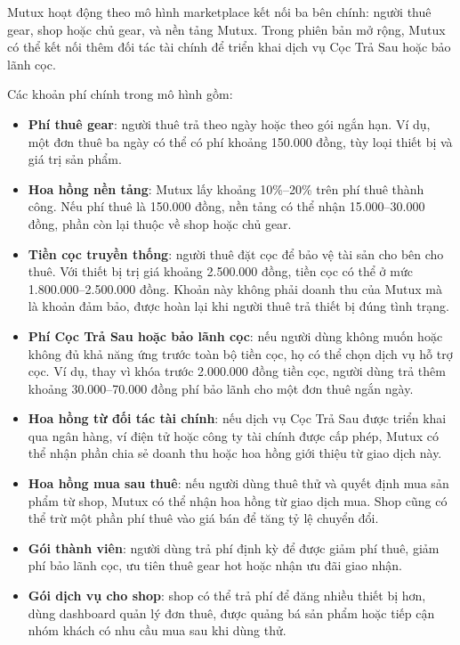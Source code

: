 Mutux hoạt động theo mô hình marketplace kết nối ba bên chính: người thuê gear, shop hoặc chủ gear, và nền tảng Mutux. Trong phiên bản mở rộng, Mutux có thể kết nối thêm đối tác tài chính để triển khai dịch vụ Cọc Trả Sau hoặc bảo lãnh cọc.

Các khoản phí chính trong mô hình gồm:

\begin{itemize}
    \item \textbf{Phí thuê gear}: người thuê trả theo ngày hoặc theo gói ngắn hạn. Ví dụ, một đơn thuê ba ngày có thể có phí khoảng 150.000 đồng, tùy loại thiết bị và giá trị sản phẩm.
    \item \textbf{Hoa hồng nền tảng}: Mutux lấy khoảng 10\%--20\% trên phí thuê thành công. Nếu phí thuê là 150.000 đồng, nền tảng có thể nhận 15.000--30.000 đồng, phần còn lại thuộc về shop hoặc chủ gear.
    \item \textbf{Tiền cọc truyền thống}: người thuê đặt cọc để bảo vệ tài sản cho bên cho thuê. Với thiết bị trị giá khoảng 2.500.000 đồng, tiền cọc có thể ở mức 1.800.000--2.500.000 đồng. Khoản này không phải doanh thu của Mutux mà là khoản đảm bảo, được hoàn lại khi người thuê trả thiết bị đúng tình trạng.
    \item \textbf{Phí Cọc Trả Sau hoặc bảo lãnh cọc}: nếu người dùng không muốn hoặc không đủ khả năng ứng trước toàn bộ tiền cọc, họ có thể chọn dịch vụ hỗ trợ cọc. Ví dụ, thay vì khóa trước 2.000.000 đồng tiền cọc, người dùng trả thêm khoảng 30.000--70.000 đồng phí bảo lãnh cho một đơn thuê ngắn ngày.
    \item \textbf{Hoa hồng từ đối tác tài chính}: nếu dịch vụ Cọc Trả Sau được triển khai qua ngân hàng, ví điện tử hoặc công ty tài chính được cấp phép, Mutux có thể nhận phần chia sẻ doanh thu hoặc hoa hồng giới thiệu từ giao dịch này.
    \item \textbf{Hoa hồng mua sau thuê}: nếu người dùng thuê thử và quyết định mua sản phẩm từ shop, Mutux có thể nhận hoa hồng từ giao dịch mua. Shop cũng có thể trừ một phần phí thuê vào giá bán để tăng tỷ lệ chuyển đổi.
    \item \textbf{Gói thành viên}: người dùng trả phí định kỳ để được giảm phí thuê, giảm phí bảo lãnh cọc, ưu tiên thuê gear hot hoặc nhận ưu đãi giao nhận.
    \item \textbf{Gói dịch vụ cho shop}: shop có thể trả phí để đăng nhiều thiết bị hơn, dùng dashboard quản lý đơn thuê, được quảng bá sản phẩm hoặc tiếp cận nhóm khách có nhu cầu mua sau khi dùng thử.
\end{itemize}

